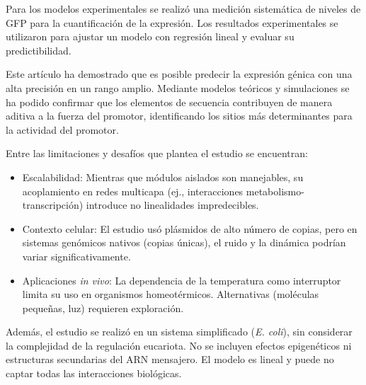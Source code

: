 \documentclass[nochap]{config/ejercicios}
\begin{document}
Para los modelos experimentales se realizó una medición sistemática de niveles de GFP para la cuantificación de la expresión. Los resultados experimentales se utilizaron para ajustar un modelo con regresión lineal y evaluar su predictibilidad. 


Este artículo ha demostrado que es posible predecir la expresión génica con una alta precisión en un rango amplio. Mediante modelos teóricos y simulaciones se ha podido confirmar que los elementos de secuencia contribuyen de manera aditiva a la fuerza del promotor, identificando los sitios más determinantes para la actividad del promotor.



Entre las limitaciones y desafíos que plantea el estudio se encuentran:
\begin{itemize}
    \item Escalabilidad: Mientras que módulos aislados son manejables, su acoplamiento en redes multicapa (ej., interacciones metabolismo-transcripción) introduce no linealidades impredecibles.
    \item Contexto celular: El estudio usó plásmidos de alto número de copias, pero en sistemas genómicos nativos (copias únicas), el ruido y la dinámica podrían variar significativamente.
    \item Aplicaciones \textit{in vivo}: La dependencia de la temperatura como interruptor limita su uso en organismos homeotérmicos. Alternativas (moléculas pequeñas, luz) requieren exploración.
\end{itemize}

Además, el estudio se realizó en un sistema simplificado (\textit{E. coli}), sin considerar la complejidad de la regulación eucariota. No se incluyen efectos epigenéticos ni estructuras secundarias del ARN mensajero. El modelo es lineal y puede no captar todas las interacciones biológicas.
\end{document}

